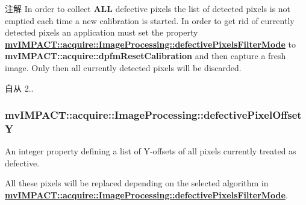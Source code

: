 \begin{DoxyNote}{注解}
In order to collect {\bfseries A\+L\+L} defective pixels the list of detected pixels is not emptied each time a new calibration is started. In order to get rid of currently detected pixels an application must set the property {\bfseries \hyperlink{classmv_i_m_p_a_c_t_1_1acquire_1_1_image_processing_ae1e060a70ed836297ef3886db0bf8a95}{mv\+I\+M\+P\+A\+C\+T\+::acquire\+::\+Image\+Processing\+::defective\+Pixels\+Filter\+Mode}} to {\bfseries mv\+I\+M\+P\+A\+C\+T\+::acquire\+::dpfm\+Reset\+Calibration} and then capture a fresh image. Only then all currently detected pixels will be discarded.
\end{DoxyNote}
\begin{DoxySince}{自从}
2.. 
\end{DoxySince}
\hypertarget{classmv_i_m_p_a_c_t_1_1acquire_1_1_image_processing_a6339b18435a6c6e16b3e2a8faba9f7f1}{
\subsubsection[{defective\+Pixel\+Offset\+Y}]{ mv\+I\+M\+P\+A\+C\+T\+::acquire\+::\+Image\+Processing\+::defective\+Pixel\+Offset\+Y}}\label{classmv_i_m_p_a_c_t_1_1acquire_1_1_image_processing_a6339b18435a6c6e16b3e2a8faba9f7f1}


An integer property defining a list of Y-\/offsets of all pixels currently treated as defective. 

All these pixels will be replaced depending on the selected algorithm in {\bfseries \hyperlink{classmv_i_m_p_a_c_t_1_1acquire_1_1_image_processing_ae1e060a70ed836297ef3886db0bf8a95}{mv\+I\+M\+P\+A\+C\+T\+::acquire\+::\+Image\+Processing\+::defective\+Pixels\+Filter\+Mode}}.


